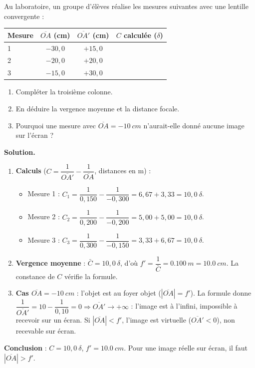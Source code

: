 \documentclass[11pt]{article}
\begin{document}
\begin{exoresolu}
Au laboratoire, un groupe d'élèves réalise les mesures suivantes avec une lentille convergente :
\begin{center}
\begin{tabular}{|l|c|c|c|}
\hline
\rowcolor{popblueL} Mesure & $\overline{OA}$ (cm) & $\overline{OA'}$ (cm) & $C$ calculée ($\delta$) \\
\hline
1 & $-30,0$ & $+15,0$ & \\
\hline
2 & $-20,0$ & $+20,0$ & \\
\hline
3 & $-15,0$ & $+30,0$ & \\
\hline
\end{tabular}
\end{center}
\begin{enumerate}
\item Compléter la troisième colonne.
\item En déduire la vergence moyenne et la distance focale.
\item Pourquoi une mesure avec $\overline{OA} = \SI{-10}{cm}$ n'aurait-elle donné aucune image sur l'écran ?
\end{enumerate}
\tcblower
\textbf{Solution.}
\begin{enumerate}
\item \textbf{Calculs} ($C = \dfrac{1}{\overline{OA'}} - \dfrac{1}{\overline{OA}}$, distances en m) :
\begin{itemize}
\item Mesure 1 : $C_1 = \dfrac{1}{0,150} - \dfrac{1}{-0,300} = 6,67 + 3,33 = 10,0\ \delta$.
\item Mesure 2 : $C_2 = \dfrac{1}{0,200} - \dfrac{1}{-0,200} = 5,00 + 5,00 = 10,0\ \delta$.
\item Mesure 3 : $C_3 = \dfrac{1}{0,300} - \dfrac{1}{-0,150} = 3,33 + 6,67 = 10,0\ \delta$.
\end{itemize}
\item \textbf{Vergence moyenne} : $\bar{C} = 10,0\ \delta$, d'où $f' = \dfrac{1}{\bar{C}} = \SI{0,100}{m} = \SI{10,0}{cm}$. La constance de $C$ vérifie la formule.
\item \textbf{Cas $\overline{OA} = \SI{-10}{cm}$} : l'objet est au foyer objet ($|\overline{OA}| = f'$). La formule donne $\dfrac{1}{\overline{OA'}} = 10 - \dfrac{1}{0,10} = 0 \Rightarrow \overline{OA'} \to +\infty$ : l'image est à l'infini, impossible à recevoir sur un écran. Si $|\overline{OA}| < f'$, l'image est virtuelle ($\overline{OA'} < 0$), non recevable sur écran.
\end{enumerate}
\textbf{Conclusion} : $C = 10,0\ \delta$, $f' = \SI{10,0}{cm}$. Pour une image réelle sur écran, il faut $|\overline{OA}| > f'$.
\end{exoresolu}
\end{document}
